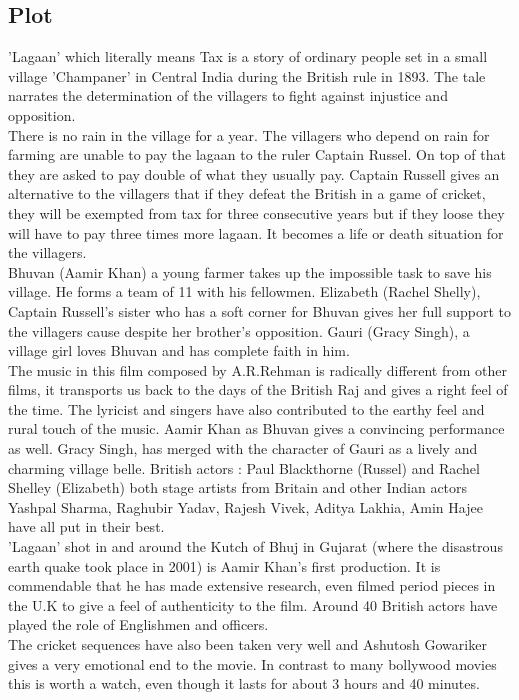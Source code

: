 \documentclass[a4paper]{article}
\begin{document}
	  \subsection{Plot }
	  'Lagaan' which literally means Tax is a story of ordinary people set in a small village 'Champaner' in Central India during the British rule in 1893. The tale narrates the determination of the villagers to fight against injustice and opposition.
	  \\
	  There is no rain in the village for a year. The villagers who depend on rain for farming are unable to pay the lagaan to the ruler Captain Russel. On top of that they are asked to pay double of what they usually pay. Captain Russell gives an alternative to the villagers that if they defeat the British in a game of cricket, they will be exempted from tax for three consecutive years but if they loose they will have to pay three times more lagaan. It becomes a life or death situation for the villagers.
\\	  
	  Bhuvan (Aamir Khan) a young farmer takes up the impossible task to save his village. He forms a team of 11 with his fellowmen. Elizabeth (Rachel Shelly), Captain Russell's sister who has a soft corner for Bhuvan gives her full support to the villagers cause despite her brother's opposition. Gauri (Gracy Singh), a village girl loves Bhuvan and has complete faith in him.
\\
The music in this film composed by A.R.Rehman is radically different from other films, it transports us back to the days of the British Raj and gives a right feel of the time. The lyricist and singers have also contributed to the earthy feel and rural touch of the music. Aamir Khan as Bhuvan gives a convincing performance as well. Gracy Singh, has merged with the character of Gauri as a lively and charming village belle. British actors : Paul Blackthorne (Russel) and Rachel Shelley (Elizabeth) both stage artists from Britain and other Indian actors Yashpal Sharma, Raghubir Yadav, Rajesh Vivek, Aditya Lakhia, Amin Hajee have all put in their best.
\\
'Lagaan' shot in and around the Kutch of Bhuj in Gujarat (where the disastrous earth quake took place in 2001) is Aamir Khan's first production. It is commendable that he has made extensive research, even filmed period pieces in the U.K to give a feel of authenticity to the film. Around 40 British actors have played the role of Englishmen and officers.
\\
The cricket sequences have also been taken very well and Ashutosh Gowariker gives a very emotional end to the movie. In contrast to many bollywood movies this is worth a watch, even though it lasts for about 3 hours and 40 minutes.
	  
	  
	

	
	
\end{document}
